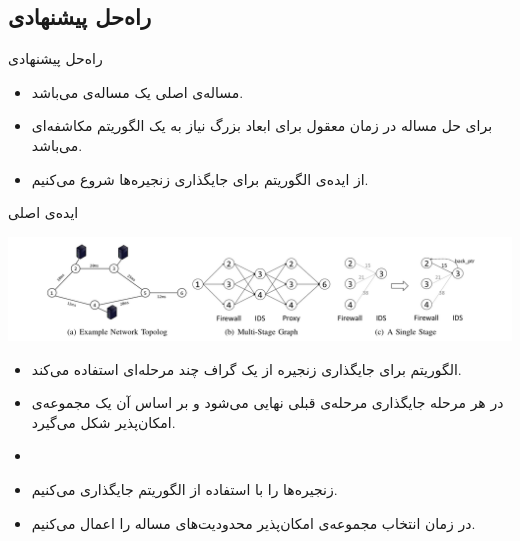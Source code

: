 \documentclass{beamer}
\makeatletter
\newcommand{\RTList}{\raggedleft\rightskip\@totalleftmargin}
\makeatother
\begin{document}
\begin{persian}
\begin{frame}{}
    \section{راه‌حل پیشنهادی}
\end{frame}
\begin{frame}{راه‌حل پیشنهادی}
    \begin{itemize}\RTList{}
        \item مساله‌ی اصلی یک مساله‌ی  می‌باشد.
        \item برای حل مساله در زمان معقول برای ابعاد بزرگ نیاز به یک الگوریتم مکاشفه‌ای می‌باشد.
        \item از ایده‌ی الگوریتم  برای جایگذاری زنجیره‌ها شروع می‌کنیم.
    \end{itemize}
\end{frame}
\begin{frame}{ایده‌ی اصلی}
    \begin{center}
        \includegraphics[scale=0.3]{images/bari.png}
    \end{center}
    \begin{itemize}\RTList{}
        \item الگوریتم برای جایگذاری زنجیره از یک گراف چند مرحله‌ای استفاده می‌کند.
        \item در هر مرحله جایگذاری مرحله‌ی قبلی نهایی می‌شود و بر اساس آن یک مجموعه‌ی امکان‌پذیر شکل می‌گیرد.
    \end{itemize}
\end{frame}
\begin{frame}{}
    \begin{itemize}\RTList{}
        \justifying
        \item {}
        \item زنجیره‌ها را با استفاده از الگوریتم  جایگذاری می‌کنیم.
        \item در زمان انتخاب مجموعه‌ی امکان‌پذیر محدودیت‌های مساله را اعمال می‌کنیم.

\end{itemize}
\end{frame}
\end{persian}
\end{document}
